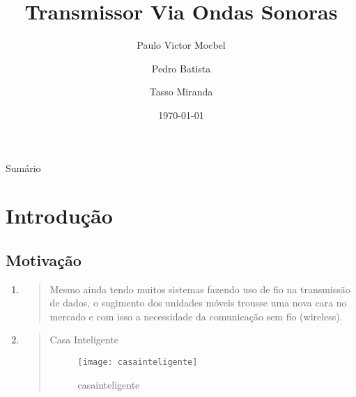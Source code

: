 \documentclass{beamer}
\title%
{Transmissor Via Ondas Sonoras}
\author%
{Paulo Victor Mocbel \and Pedro Batista \and Tasso Miranda}%
\institute %
{
Trabalho Final de Disciplina\\
Análise e Projeto de Sistemas de Software \\
Faculdade de Engenharia de Computação\\
      Universidade Federal do Pará \\
      http://www.laps.ufpa.br/falabrasil\\%
}
\date[8 de Novembro de 2010] %
{\today}
\begin{document}
\begin{frame}
\titlepage
\end{frame}

\begin{frame}{Sumário}

\footnotesize
\tableofcontents
\end{frame}



\section{Introdução}

\subsection{Motivação}

\begin{frame}
   \begin{enumerate}
      \item 
      \begin{quote}
	 Mesmo ainda tendo muitos sistemas fazendo uso de fio na transmissão de  dados, o sugimento dos unidades móveis trousse uma nova cara no mercado e com isso a necessidade da comunicação sem fio (wireless).
      \end{quote}
      \item 
	 \begin{quote}
	    Casa Inteligente
	    \begin{figure}[t]

	  \centering

	  \texttt{[image: casainteligente]}

	  \caption{casainteligente}

	  \label{fig:Casa Inteligente}

	  \end{figure}

	 \end{quote}

	 \end{enumerate}

\end{frame}
\end{document}
